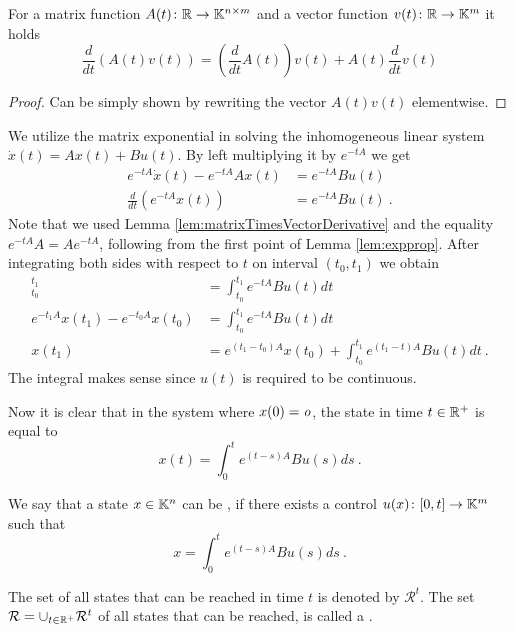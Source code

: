 \begin{lemma}
\label{lem:matrixTimesVectorDerivative}
	For a matrix function $A(t)\colon\mathbb{R}\to\mathbb{K}^{n\times m}$ and a vector function $v(t)\colon\mathbb{R}\to\mathbb{K}^m$ it holds 
	$$\frac{d}{dt}\left(A(t)v(t)\right)=\left(\frac{d}{dt}A(t)\right)v(t)+A(t)\frac{d}{dt}v(t)$$
\end{lemma}

\begin{proof}
	Can be simply shown by rewriting the vector $A(t)v(t)$ elementwise.
\end{proof}

We utilize the matrix exponential in solving the inhomogeneous linear system $\dot{x}(t)=Ax(t)+Bu(t)$. By left multiplying it by $e^{-tA}$ we get
\begin{align*}
	e^{-tA}\dot{x}(t)-e^{-tA}Ax(t) &=e^{-tA}Bu(t) \\
	\frac{d}{dt} (e^{-tA}x(t)) &=e^{-tA}Bu(t)\ .
\end{align*}
Note that we used Lemma \ref{lem:matrixTimesVectorDerivative} and the equality $e^{-tA}A=Ae^{-tA}$, following from the first point of Lemma \ref{lem:expprop}. After integrating both sides with respect to $t$ on interval $(t_0,t_1)$ we obtain
\begin{align*}
	[e^{-tA}x(t)]^{t_1}_{t_0}&=\int^{t_1}_{t_0}e^{-tA}Bu(t)dt \\
	e^{-t_1A}x(t_1)-e^{-t_0A}x(t_0)&=\int^{t_1}_{t_0}e^{-tA}Bu(t)dt \\
	x(t_1)&=e^{(t_1-t_0)A}x(t_0)+\int^{t_1}_{t_0}e^{(t_1-t)A}Bu(t)dt\ .
\end{align*}
The integral makes sense since $u(t)$ is required to be continuous.

Now it is clear that in the system where $x(0)=\textit{o}$, the state in time $t\in \mathbb{R}^+$ is equal to
\begin{equation}
\label{eq:coolVzorec}
	x(t)=\int^t_0 e^{(t-s)A}Bu(s)ds\ .
\end{equation}

\begin{definition}
	We say that a state $x\in\mathbb{K}^n$ can be , if there exists a control $u(x)\colon[0,t]\rightarrow\mathbb{K}^m$ such that
	$$x=\int^t_0 e^{(t-s)A}Bu(s)ds\ .$$

	The set of all states that can be reached in time $t$ is denoted by $\mathcal{R}^t$. The set $\mathcal{R}=\cup_{t\in\mathbb{R}^+}\mathcal{R}^t$ of all states that can be reached, is called a .
\end{definition}

